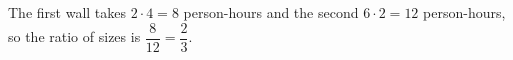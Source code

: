 The first wall takes \(2\cdot 4=8\) person-hours and the second \(6\cdot 2=12\) person-hours, so the ratio of sizes is \(\dfrac{8}{12}=\boxed{\dfrac{2}{3}}\).
